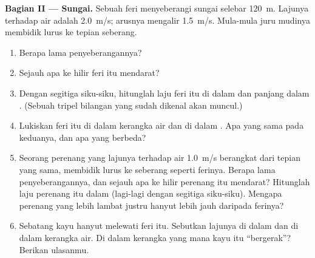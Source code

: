 \begin{problem}
\medskip
\noindent\textbf{Bagian II --- Sungai.}
Sebuah feri menyeberangi sungai selebar \qty{120}{m}. Lajunya terhadap
air adalah \qty{2.0}{m/s}; arusnya mengalir \qty{1.5}{m/s}. Mula-mula
juru mudinya membidik lurus ke tepian seberang.
\begin{enumerate}[resume]
  \item Berapa lama penyeberangannya?
  \item Sejauh apa ke hilir feri itu mendarat?
  \item Dengan segitiga siku-siku, hitunglah laju feri itu di dalam
         dan panjang  dalam .
        (Sebuah tripel bilangan yang sudah dikenal akan muncul.)
  \item Lukiskan  feri itu di dalam kerangka air dan di dalam
        . Apa yang sama pada keduanya, dan apa yang
        berbeda?
  \item Seorang perenang yang lajunya terhadap air \qty{1.0}{m/s}
        berangkat dari tepian yang sama, membidik lurus ke seberang
        seperti ferinya. Berapa lama penyeberangannya, dan sejauh apa
        ke hilir perenang itu mendarat? Hitunglah laju perenang itu
        dalam  (lagi-lagi dengan segitiga siku-siku).
        Mengapa perenang yang lebih lambat justru hanyut lebih jauh
        daripada ferinya?
  \item Sebatang kayu hanyut melewati feri itu. Sebutkan lajunya di
        dalam  dan di dalam kerangka air. Di dalam
        kerangka yang mana kayu itu ``bergerak''? Berikan ulasanmu.
\end{enumerate}


\end{problem}
